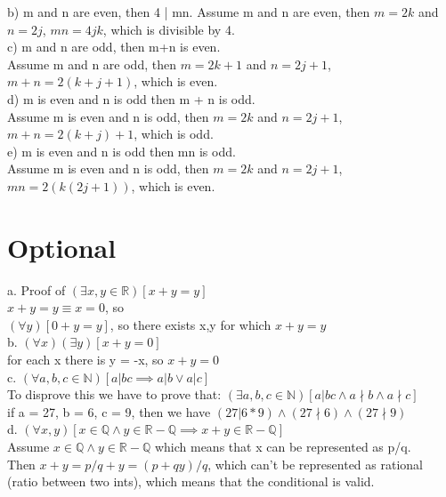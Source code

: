 \documentclass{article}
\begin{document}
b) m and n are even, then 4 | mn.
Assume m and n are even, then $m = 2k$ and $n = 2j$, $mn = 4jk$, which is divisible by 4.\\

c) m and n are odd, then m+n is even.\\
Assume m and n are odd, then $m = 2k + 1$ and $n = 2j + 1$, $m+n = 2(k + j + 1)$, which is even.\\

d) m is even and n is odd then m + n is odd.\\
Assume m is even and n is odd, then $m = 2k$ and $n = 2j + 1$, $m+n = 2(k + j) + 1$, which is odd.\\

e) m is even and n is odd then mn is odd.\\
Assume m is even and n is odd, then $m = 2k$ and $n = 2j + 1$, $mn = 2(k(2j + 1))$, which is even.\\

\section{Optional}
a. Proof of $(\exists x,y \in \mathbb{R})[x + y = y]$\\
$x + y = y \equiv x = 0$, so\\
$(\forall y)[0 + y = y]$, so there exists x,y for which $x + y = y$\\

b. $(\forall x)(\exists y)[x + y = 0]$\\
for each x there is y = -x, so $x + y = 0$\\

c. $(\forall a,b,c \in \mathbb{N})[a | bc \implies a | b \vee a | c]$\\
To disprove this we have to prove that:
$(\exists a,b,c \in \mathbb{N})[a | bc \wedge a \nmid b \wedge a \nmid c]$ \\
if a = 27, b = 6, c = 9, then we have $(27 | 6*9) \wedge (27 \nmid 6) \wedge (27 \nmid 9)$\\

d. $(\forall x,y)[x \in \mathbb{Q} \wedge y \in \mathbb{R-Q} \implies x + y \in \mathbb{R-Q}]$\\
Assume $x \in \mathbb{Q} \wedge y \in \mathbb{R-Q}$ which means that x can be represented as p/q.\\
Then $x + y = p/q + y = (p + qy)/q$, which can't be represented as rational (ratio between two ints), which means that the conditional is valid.\\
\end{document}
